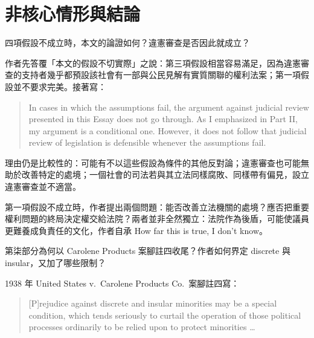\chapter{非核心情形與結論}


\begin{qaquestion}
四項假設不成立時，本文的論證如何？違憲審查是否因此就成立？
\end{qaquestion}

作者先答覆「本文的假設不切實際」之說：第三項假設相當容易滿足，因為違憲審查的支持者幾乎都預設該社會有一部與公民見解有實質關聯的權利法案；第一項假設並不要求完美。接著寫：

\begin{quote}
In cases in which the assumptions fail, the argument against judicial review presented in this Essay does not go through. As I emphasized in Part II, my argument is a conditional one. However, it does not follow that judicial review of legislation is defensible whenever the assumptions fail.
\end{quote}

理由仍是比較性的：可能有不以這些假設為條件的其他反對論；違憲審查也可能無助於改善特定的處境；一個社會的司法若與其立法同樣腐敗、同樣帶有偏見，設立違憲審查並不適當。

第一項假設不成立時，作者提出兩個問題：能否改善立法機關的處境？應否把重要權利問題的終局決定權交給法院？兩者並非全然獨立：法院作為後盾，可能使議員更難養成負責任的文化，作者自承 How far this is true, I don't know。


\begin{qaquestion}
第柒部分為何以 Carolene Products 案腳註四收尾？作者如何界定 discrete 與 insular，又加了哪些限制？
\end{qaquestion}

1938 年 United States v.\ Carolene Products Co.\ 案腳註四寫：

\begin{quote}
[P]rejudice against discrete and insular minorities may be a special condition, which tends seriously to curtail the operation of those political processes ordinarily to be relied upon to protect minorities \ldots{}
\end{quote}

